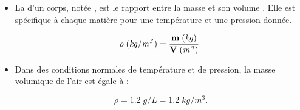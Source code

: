 \begin{mybilan}
	
	\begin{itemize}
		\item La  d'un corps, notée \kw{$\rho$}, est le rapport entre la masse  et son volume . Elle est spécifique à chaque matière pour une température et une pression donnée.\pause
		
		\begin{equation*}
		\mathbf{\rho} \; \mathit{{\small (kg/m^3)}} = \frac{\mathbf{m} \; \mathit{{\small (kg)}}}{\mathbf{V} \; \mathit{{\small (m^3)}}}\ 
		\end{equation*}
		
		\item Dans des conditions normales de température et de pression, la masse volumique de l'air est égale à :
		
			\begin{equation*}
				\rho = \num{1.2} \;g/L = \num{1.2} \;kg/m^3.
			\end{equation*} 
	\end{itemize}
	

	
\end{mybilan}